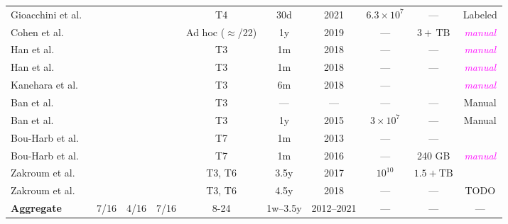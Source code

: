 \documentclass[manuscript,nonacm]{acmart}
\newcommand{\cmark}{\ding{51}}%
\newcommand{\wc}[1]{\textit{\textcolor{magenta}{#1}}} %
\begin{document}
\begin{table}[h!]
\begin{tabular}{@{}lccccccccc@{}}
        Gioacchini et al.~\cite{2021gioacchini,2023gioacchini}
        & \cite{2020cohen}
        & \cmark & \cmark
        & T4
        & 30d & 2021
        & $6.3\times10^{7}$ & ---
        & Labeled \\

        Cohen et al.~\cite{2020cohen}
        & \cite{2016ban}
        &  & \cmark
        & Ad hoc ($\approx$/22)
        & 1y & 2019
        & --- & $3+\,\mathrm{TB}$
        & \wc{manual} \\

        Han et al.~\cite{2021han,2022han}
        & \cite{2020han,2006takeuchi,2019kanehara}
        & \cmark & 
        & T3
        & 1m & 2018
        & --- & ---
        & \wc{manual} \\

        Han et al.~\cite{2020han,2022han}
        & \cite{2006takeuchi}
        & \cmark & \cmark
        & T3
        & 1m & 2018
        & --- & ---
        & \wc{manual} \\

        Kanehara et al.~\cite{2019kanehara,2022han}
        & 
        &  & \cmark
        & T3
        & 6m & 2018
        & --- &
        & \wc{manual} \\

        Ban et al.~\cite{2017ban}
        & \cite{2012ban}
        &  & 
        & T3
        & --- & ---
        & --- & ---
        & Manual \\

        Ban et al.~\cite{2016ban}
        & 
        &  & 
        & T3
        & 1y & 2015
        & $3\times10^{7}$ & ---
        & Manual \\

        Bou-Harb et al.~\cite{2014bouharb}
        &  
        &  & 
        & T7
        & 1m & 2013
        & --- & ---
        &  \\

        Bou-Harb et al.~\cite{2019bouharb,2015bouharb}
        & \cmark
        &  & \cmark
        & T7
        & 1m & 2016
        & --- & 240 GB
        & \wc{manual} \\

        Zakroum et al.~\cite{2022zakroum,2018zakroum}
        & ~\cite{2018zakroum}
        & & \cmark
        & T3, T6
        & 3.5y & 2017
        & $10^{10}$ & $1.5+\mathrm{TB}$
        &  \\

        Zakroum et al.~\cite{2023zakroum}
        & ~\cite{2023zakroum}
        & &
        & T3, T6
        & 4.5y & 2018
        & --- & ---
        & TODO \\

        \midrule
        \textbf{Aggregate}
        & 7/16
        & 4/16 & 7/16
        & 8-24
        & 1w--3.5y & 2012--2021
        & --- & ---
        & --- \\
        \bottomrule
    \end{tabular}
\end{table}
\end{document}
